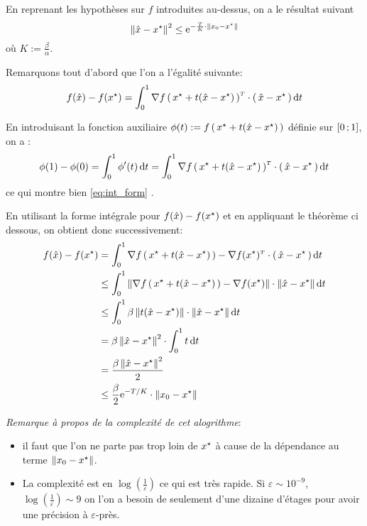    \begin{theorem}
En reprenant les hypothèses sur $f$ introduites au-dessus, on a le résultat suivant
\begin{equation}
\norme{\xhat - \xopt}^2 \leq \e^{-\frac{T}{K} \cdot \norme{x_0-\xopt}}
\end{equation}
où $K := \frac{\beta}{\alpha}$.
   \end{theorem}

Remarquons tout d'abord que l'on a l'égalité suivante:
\begin{equation}
  f(\xhat)- f(\xopt) = \int_{0}^{1} \transpose{\grad f\prt{\xopt+t(\xhat-\xopt)}}
   \cdot \prt{\xhat- \xopt} \dt
\end{equation}

En introduisant la fonction auxiliaire $\phi(t):= f\prt{\xopt+t(\xhat-\xopt)}$ définie sur $\mathopen{[}0\mathpunct{};1\mathclose{]}$, on a :
\begin{equation*}\label{eq:int_form}
  \phi(1)-\phi(0)= \int_0^1 \phi^{\prime}(t) \dt = \int_{0}^{1} \transpose{\grad f\prt{\xopt+t(\xhat-\xopt)}}
   \cdot \prt{\xhat- \xopt} \dt
\end{equation*}
ce qui montre bien \eqref{eq:int_form} .

En utilisant la forme intégrale pour $f(\xhat)- f(\xopt)$ et en appliquant le théorème
ci dessous, on obtient donc successivement:
\begin{align*}
f(\xhat)- f(\xopt) &= \int_{0}^{1} \transpose{\grad f\prt{\xopt+t(\xhat-\xopt)}
- \grad f(\xopt)}
 \cdot \prt{\xhat- \xopt} \dt\\
 &\leq \int_{0}^{1} \norme{\grad f\prt{\xopt+t(\xhat-\xopt)} - \grad f(\xopt)}
  \cdot \norme{\xhat- \xopt} \dt\\
 &\leq \int_{0}^{1} \beta \norme{t(\xhat-\xopt)}
  \cdot \norme{\xhat- \xopt} \dt\\
 &= \beta \norme{\xhat- \xopt}^2 \cdot \int_{0}^{1} t  \dt\\
 &= \frac{ \beta \norme{\xhat- \xopt}^2}{2} \\
 &\leq \frac{\beta}{2} \e^{-T/K} \cdot \norme{x_0-\xopt}
\end{align*}

\textit{Remarque à propos de la complexité de cet alogrithme}:
\begin{itemize}
  \item il faut que l'on ne parte pas trop loin de $\xopt$ à cause de la dépendance au terme $\norme{x_0-\xopt}$.
  \item La complexité est en $\log(\frac{1}{\varepsilon})$ ce qui est très rapide. Si $\varepsilon \sim 10^{-9}$, $\log(\frac{1}{\varepsilon}) \sim 9$ on l'on a besoin de seulement
  d'une dizaine d'étages pour avoir une précision à $\varepsilon$-près.

\end{itemize}

